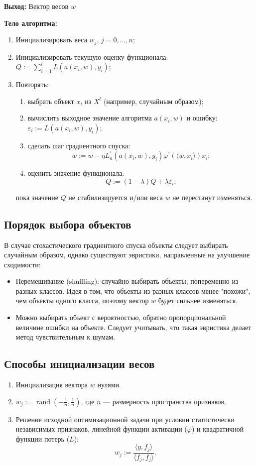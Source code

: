 \textbf{Выход:} Вектор весов \( w \)

\textbf{Тело алгоритма:}
\begin{enumerate}
    \item Инициализировать веса \( w_j \), \( j = 0, \dots, n \);
    \item Инициализировать текущую оценку функционала: \( Q := \sum_{i=1}^l L(a(x_i, w), y_i) \);
    \item Повторять:
    \begin{enumerate}
        \item выбрать объект \( x_i \) из \( X^l \) (например, случайным образом);
        \item вычислить выходное значение алгоритма \( a(x_i, w) \) и ошибку: \( \varepsilon_i := L(a(x_i, w), y_i) \);
        \item сделать шаг градиентного спуска:
        $$ w := w - \eta L_a^\prime (a(x_i, w), y_i) \varphi^\prime (\langle w, x_i \rangle)x_i; $$
        \item оценить значение функционала:
        $$ Q := (1 - \lambda)Q + \lambda\varepsilon_i; $$
    \end{enumerate}
    пока значение \( Q \) не стабилизируется и/или веса \( w \) не перестанут изменяться.
\end{enumerate}

\subsection*{Порядок выбора объектов}
В случае стохастического градиентного спуска объекты следует выбирать случайным образом, однако существуют эвристики, направленные на улучшение сходимости:
\begin{itemize}
    \item Перемешивание (shuffling): случайно выбирать объекты, попеременно из разных классов. Идея в том, что объекты из разных классов менее "похожи", чем объекты одного класса, поэтому вектор \( w \) будет сильнее изменяться.
    \item Можно выбирать объект с вероятностью, обратно пропорциональной величине ошибки на объекте. Следует учитывать, что такая эвристика делает метод чувствительным к шумам.
\end{itemize}

\subsection*{Способы инициализации весов}
\begin{enumerate}
    \item Инициализация вектора \( w \) нулями.
    \item \( w_j := \operatorname{rand}\left(-\frac{1}{n}, \frac{1}{n}\right) \), где \( n \) — размерность пространства признаков.
    \item Решение исходной оптимизационной задачи при условии статистически независимых признаков, линейной функции активации (\( \varphi \)) и квадратичной функции потерь (\( L \)):
    $$ w_j := \frac{\langle y, f_j \rangle}{\langle f_j, f_j \rangle}. $$
\end{enumerate}

